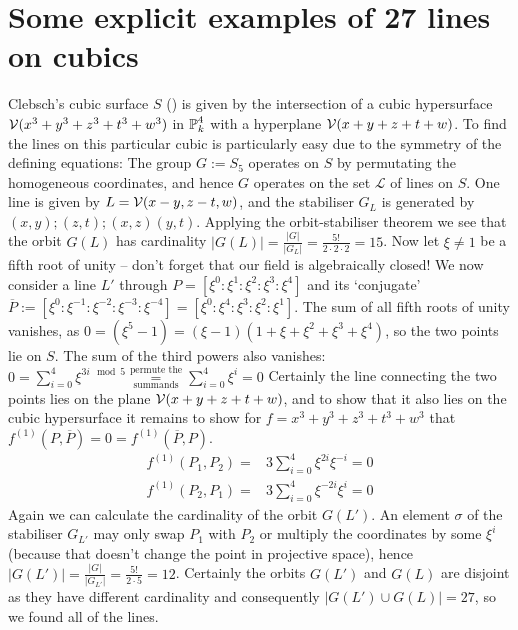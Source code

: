 \section{Some explicit examples of 27 lines on cubics}


\begin{example}
Clebsch's cubic surface $S$ (\cite[§16,p.331 ff.]{clebsch1871ueber}) is given by the intersection of a cubic hypersurface $\operatorname{\mathcal V}(x^3 + y^3 + z^3 + t^3 + w^3)$ in $\operatorname{\mathbb P}^4_k$ with a hyperplane $\operatorname{\mathcal V}(x+y+z+t+w)$.
To find the lines on this particular cubic is particularly easy due to the symmetry of the defining equations: The group $G := S_5$ operates on $S$ by permutating the homogeneous coordinates, and hence $G$ operates on the set $\mathcal L$ of lines on $S$.
One line is given by $L = \operatorname{\mathcal V}(x-y,z-t,w)$, and the stabiliser $G_L$ is generated by $(x,y);(z,t);(x,z)(y,t)$.
Applying the orbit-stabiliser theorem we see that the orbit $G(L)$ has cardinality $|G(L)| = \frac{|G|}{|G_L|} = \frac{5!}{2\cdot2\cdot2} = 15$.
Now let $\xi \neq 1$ be a fifth root of unity -- don't forget that our field is algebraically closed!
We now consider a line $L'$ through $P = [\xi^0:\xi^1:\xi^2:\xi^3:\xi^4]$ and its `conjugate' $\overline{P} := [\xi^0:\xi^{-1}:\xi^{-2}:\xi^{-3}:\xi^{-4}] = [\xi^0:\xi^4:\xi^3:\xi^2:\xi^1]$.
The sum of all fifth roots of unity vanishes, as $0 = (\xi^5 - 1) = (\xi - 1)(1 + \xi + \xi^2+\xi^3+\xi^4)$, so the two points lie on $S$.
The sum of the third powers also vanishes: $0 = \sum_{i=0}^4 \xi^{3i \mod 5} \overset{\text{permute the}}{\underset{\text{summands}}=} \sum_{i=0}^4 \xi^i = 0$
Certainly the line connecting the two points lies on the plane $\operatorname{\mathcal V}(x+y+z+t+w)$, and to show that it also lies on the cubic hypersurface it remains to show for $f = x^3 + y^3 + z^3 + t^3 + w^3$ that $f^{(1)}(P,\overline P) = 0 = f^{(1)}(\overline P,P)$.
\begin{align}
f^{(1)}(P_1,P_2) =& 3 \sum_{i=0}^4 \xi^{2i}\xi^{-i} = 0 \\
f^{(1)}(P_2,P_1) =& 3 \sum_{i=0}^4 \xi^{-2i}\xi^{i} = 0
\end{align}
Again we can calculate the cardinality of the orbit $G(L')$.
An element $\sigma$ of the stabiliser $G_{L'}$ may only swap $P_1$ with $P_2$ or multiply the coordinates by some $\xi^i$ (because that doesn't change the point in projective space), hence $|G(L')| = \frac{|G|}{|G_{L'}|} = \frac{5!}{2\cdot 5} = 12$.
Certainly the orbits $G(L')$ and $G(L)$ are disjoint as they have different cardinality and consequently $|G(L') \cup G(L)| = 27$, so we found all of the lines.
\end{example}


